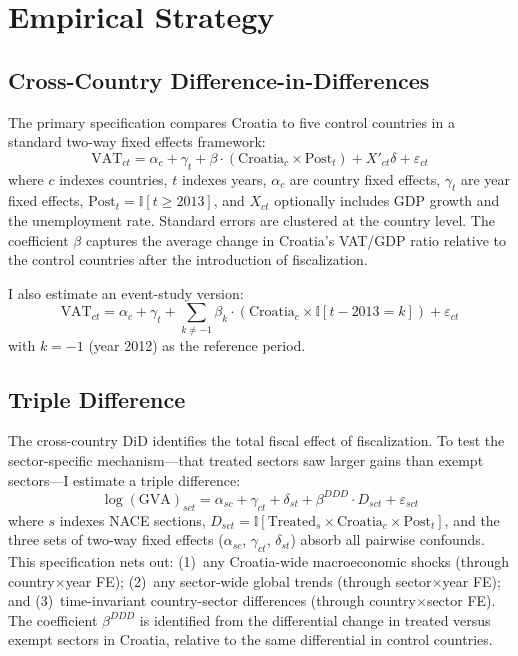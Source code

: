 \documentclass[12pt]{article}
\newcommand{\ind}{\mathbb{I}}
\begin{document}
\section{Empirical Strategy}
\label{sec:strategy}

\subsection{Cross-Country Difference-in-Differences}

The primary specification compares Croatia to five control countries in a standard two-way fixed effects framework:
\begin{equation}
\text{VAT}_{ct} = \alpha_c + \gamma_t + \beta \cdot (\text{Croatia}_c \times \text{Post}_t) + X'_{ct}\delta + \varepsilon_{ct}
\label{eq:did}
\end{equation}
where $c$ indexes countries, $t$ indexes years, $\alpha_c$ are country fixed effects, $\gamma_t$ are year fixed effects, $\text{Post}_t = \ind[t \geq 2013]$, and $X_{ct}$ optionally includes GDP growth and the unemployment rate. Standard errors are clustered at the country level. The coefficient $\beta$ captures the average change in Croatia's VAT/GDP ratio relative to the control countries after the introduction of fiscalization.

I also estimate an event-study version:
\begin{equation}
\text{VAT}_{ct} = \alpha_c + \gamma_t + \sum_{k \neq -1} \beta_k \cdot (\text{Croatia}_c \times \ind[t - 2013 = k]) + \varepsilon_{ct}
\label{eq:eventstudy}
\end{equation}
with $k = -1$ (year 2012) as the reference period.

\subsection{Triple Difference}

The cross-country DiD identifies the total fiscal effect of fiscalization. To test the sector-specific mechanism---that treated sectors saw larger gains than exempt sectors---I estimate a triple difference:
\begin{equation}
\log(\text{GVA})_{sct} = \alpha_{sc} + \gamma_{ct} + \delta_{st} + \beta^{DDD} \cdot D_{sct} + \varepsilon_{sct}
\label{eq:ddd}
\end{equation}
where $s$ indexes NACE sections, $D_{sct} = \ind[\text{Treated}_s \times \text{Croatia}_c \times \text{Post}_t]$, and the three sets of two-way fixed effects ($\alpha_{sc}$, $\gamma_{ct}$, $\delta_{st}$) absorb all pairwise confounds. This specification nets out: (1)~any Croatia-wide macroeconomic shocks (through country$\times$year FE); (2)~any sector-wide global trends (through sector$\times$year FE); and (3)~time-invariant country-sector differences (through country$\times$sector FE). The coefficient $\beta^{DDD}$ is identified from the differential change in treated versus exempt sectors in Croatia, relative to the same differential in control countries.
\end{document}
